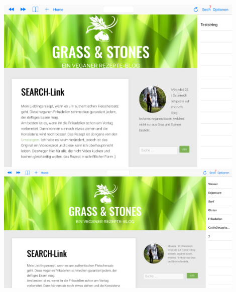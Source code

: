 \includegraphics[width=12cm]{Pics/WKWebView_Hochformat}
\newpage
\includegraphics[width=12cm]{Pics/WKWebView_Querformat}


